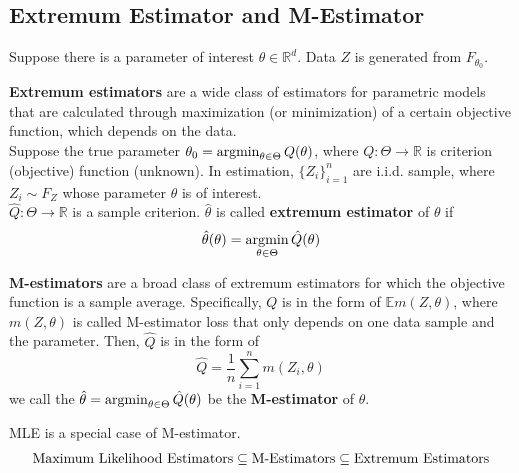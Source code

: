 \documentclass[11pt]{elegantbook}
\newcommand{\argmin}{\operatornamewithlimits{argmin}}
\begin{document}
\subsection{Extremum Estimator and M-Estimator}
Suppose there is a parameter of interest $\theta\in \mathbb{R}^d$. Data $Z$ is generated from $F_{\theta_0}$.
\begin{definition}
    \normalfont
    \textbf{Extremum estimators} are a wide class of estimators for parametric models that are calculated through maximization (or minimization) of a certain objective function, which depends on the data.\\
    Suppose the true parameter $\theta_0=\argmin_{\theta\in\Theta} Q(\theta)$, where $Q: \Theta \rightarrow \mathbb{R}$ is criterion (objective) function (unknown). In estimation, $\{Z_i\}_{i=1}^n$ are i.i.d. sample, where $Z_i\sim F_Z$ whose parameter $\theta$ is of interest.\\
    $\hat{Q}: \Theta \rightarrow \mathbb{R}$ is a sample criterion. $\hat{\theta}$ is called \textbf{extremum estimator} of $\theta$ if $$\hat{\theta}(\theta)=\argmin_{\theta\in\Theta} \hat{Q}(\theta)$$
\end{definition}

\begin{definition}[M-Estimator]
    \normalfont
    \textbf{M-estimators} are a broad class of extremum estimators for which the objective function is a sample average. Specifically, $Q$ is in the form of $\mathbb{E}m(Z,\theta)$, where $m(Z,\theta)$ is called M-estimator loss that only depends on one data sample and the parameter. Then, $\hat{Q}$ is in the form of $$\hat{Q}=\frac{1}{n}\sum_{i=1}^n m(Z_i,\theta)$$
    we call the $\hat{\theta}=\argmin_{\theta\in\Theta} \hat{Q}(\theta)$ be the \textbf{M-estimator} of $\theta$.
\end{definition}
MLE is a special case of M-estimator.
\begin{equation}
    \begin{aligned}
        \textnormal{Maximum Likelihood Estimators}\subseteq \textnormal{M-Estimators}\subseteq \textnormal{Extremum Estimators}
    \end{aligned}
    \nonumber
\end{equation}
\end{document}

